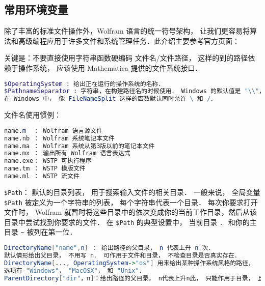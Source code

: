 
\begin{issues}
\issueDraft
\issueTODO
\end{issues}

\subsection{常用环境变量}

除了丰富的标准文件操作外，Wolfram 语言的统一符号架构，
让我们更容易将算法和高级编程应用于许多文件和系统管理任务．此介绍主要参考官方页面：


关键是：不要直接使用字符串函数硬编码 文件名/文件路径， 
这样的到的路径依赖于操作系统， 应该使用 Mathematica 提供的文件系统接口．

\begin{lstlisting}[language=mathematica]
$OperatingSystem : 给出正在运行的操作系统的名称．
$PathnameSeparator : 字符串，在构建路径名的时候使用． Windows 的默认值是 "\\"， 其他系统是 "/"．
在 Windows 中， 像 FileNameSplit 这样的函数默认同时允许 \ 和 /．
\end{lstlisting}

文件名使用惯例：

\begin{lstlisting}[language=mathematica]
name.m  ： Wolfram 语言源文件
name.nb ： Wolfram 系统笔记本文件
name.ma ： Wolfram 系统从第3版以前的笔记本文件
name.mx ： 输出所有 Wolfram 语言表达式
name.exe： WSTP 可执行程序
name.tm ： WSTP 模版文件
name.ml ： WSTP 流文件
\end{lstlisting}


\verb`$Path`： 默认的目录列表， 用于搜索输入文件的相关目录． 
一般来说， 全局变量 \verb`$Path` 被定义为一个字符串的列表， 每个字符串代表一个目录．
每次你要求打开文件时， Wolfram 就暂时将这些目录中的依次变成你的当前工作目录，然后从该目录中尝试找到你要求的文件．
在 \verb`$Path` 的典型设置中， 当前目录 \verb`．` 和你的主目录 \verb`~` 被列在第一位．

\begin{lstlisting}[language=mathematica]
DirectoryName["name",n] ： 给出路径的父目录， n 代表上升 n 次． 
默认情形给出父目录， 不用写 n． 可作用于文件和目录， 不检查目录是否真实存在．
DirectoryName[..., OperatingSystem->"os"] 用来给出某种操作系统风格的路径， 
选项有 "Windows"， "MacOSX"， 和 "Unix"．
ParentDirectory["dir"，n]：给出路径的父目录， n代表上升n此， 只能作用于目录， 且要求目录真实存在．
\end{lstlisting}

